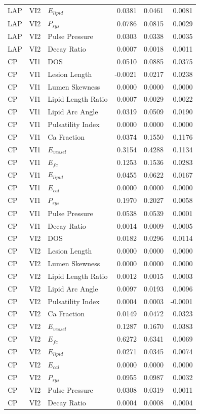 \documentclass[preprint,12pt]{elsarticle}
\begin{document}
\begin{longtable}{lllrrr}
LAP & VI2 & $E_{lipid}$ & 0.0381 & 0.0461 & 0.0081 \\
LAP & VI2 & $P_{sys}$ & 0.0786 & 0.0815 & 0.0029 \\
LAP & VI2 & Pulse Pressure & 0.0303 & 0.0338 & 0.0035 \\
LAP & VI2 & Decay Ratio & 0.0007 & 0.0018 & 0.0011 \\
CP & VI1 & DOS & 0.0510 & 0.0885 & 0.0375 \\
CP & VI1 & Lesion Length & -0.0021 & 0.0217 & 0.0238 \\
CP & VI1 & Lumen Skewness & 0.0000 & 0.0000 & 0.0000 \\
CP & VI1 & Lipid Length Ratio & 0.0007 & 0.0029 & 0.0022 \\
CP & VI1 & Lipid Arc Angle & 0.0319 & 0.0509 & 0.0190 \\
CP & VI1 & Pulsatility Index & 0.0000 & 0.0000 & 0.0000 \\
CP & VI1 & Ca Fraction & 0.0374 & 0.1550 & 0.1176 \\
CP & VI1 & $E_{vessel}$ & 0.3154 & 0.4288 & 0.1134 \\
CP & VI1 & $E_{fc}$ & 0.1253 & 0.1536 & 0.0283 \\
CP & VI1 & $E_{lipid}$ & 0.0455 & 0.0622 & 0.0167 \\
CP & VI1 & $E_{cal}$ & 0.0000 & 0.0000 & 0.0000 \\
CP & VI1 & $P_{sys}$ & 0.1970 & 0.2027 & 0.0058 \\
CP & VI1 & Pulse Pressure & 0.0538 & 0.0539 & 0.0001 \\
CP & VI1 & Decay Ratio & 0.0014 & 0.0009 & -0.0005 \\
CP & VI2 & DOS & 0.0182 & 0.0296 & 0.0114 \\
CP & VI2 & Lesion Length & 0.0000 & 0.0000 & 0.0000 \\
CP & VI2 & Lumen Skewness & 0.0000 & 0.0000 & 0.0000 \\
CP & VI2 & Lipid Length Ratio & 0.0012 & 0.0015 & 0.0003 \\
CP & VI2 & Lipid Arc Angle & 0.0097 & 0.0193 & 0.0096 \\
CP & VI2 & Pulsatility Index & 0.0004 & 0.0003 & -0.0001 \\
CP & VI2 & Ca Fraction & 0.0149 & 0.0472 & 0.0323 \\
CP & VI2 & $E_{vessel}$ & 0.1287 & 0.1670 & 0.0383 \\
CP & VI2 & $E_{fc}$ & 0.6272 & 0.6341 & 0.0069 \\
CP & VI2 & $E_{lipid}$ & 0.0271 & 0.0345 & 0.0074 \\
CP & VI2 & $E_{cal}$ & 0.0000 & 0.0000 & 0.0000 \\
CP & VI2 & $P_{sys}$ & 0.0955 & 0.0987 & 0.0032 \\
CP & VI2 & Pulse Pressure & 0.0308 & 0.0319 & 0.0011 \\
CP & VI2 & Decay Ratio & 0.0004 & 0.0008 & 0.0004 \\
\end{longtable}
\end{document}
